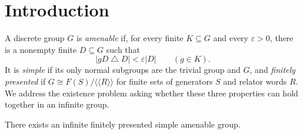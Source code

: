 \section{Introduction}\label{sec:introduction}

A discrete group $G$ is \emph{amenable} if, for every finite
$K\subseteq G$ and every $\varepsilon>0$, there is a nonempty finite
$D\subseteq G$ such that
\begin{equation}\label{eq:folner-introduction}
 |gD\mathbin{\triangle}D|<\varepsilon |D|
 \qquad(g\in K).
\end{equation}
It is \emph{simple} if its only normal subgroups are the trivial
group and $G$, and \emph{finitely presented} if
$G\cong F(S)/\langle\!\langle R\rangle\!\rangle$ for finite sets
of generators $S$ and relator words $R$. We address the existence
problem asking whether these three properties can hold together
in an infinite group.

\begin{theorem}\label{thm:main}
There exists an infinite finitely presented simple amenable group.
\end{theorem}

